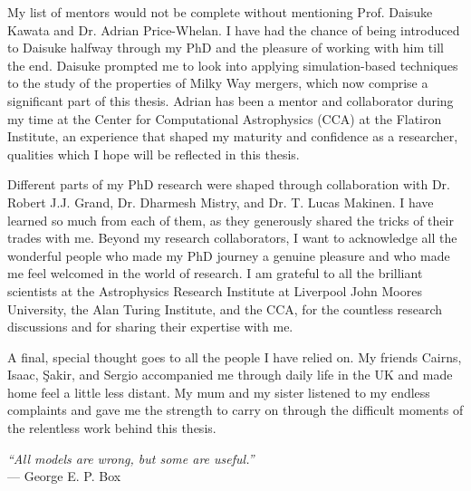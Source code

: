 \documentclass[a4paper,12pt,oneside]{report}
\begin{document}
\medskip

My list of mentors would not be complete without mentioning Prof. Daisuke Kawata and Dr. Adrian Price-Whelan. I have had the chance of being introduced to Daisuke halfway through my PhD and the pleasure of working with him till the end. Daisuke prompted me to look into applying simulation-based techniques to the study of the properties of Milky Way mergers, which now comprise a significant part of this thesis. Adrian has been a mentor and collaborator during my time at the Center for Computational Astrophysics (CCA) at the Flatiron Institute, an experience that shaped my maturity and confidence as a researcher, qualities which I hope will be reflected in this thesis.

\medskip

Different parts of my PhD research were shaped through collaboration with Dr. Robert J.J. Grand, Dr. Dharmesh Mistry, and Dr. T. Lucas Makinen. I have learned so much from each of them, as they generously shared the tricks of their trades with me. Beyond my research collaborators, I want to acknowledge all the wonderful people who made my PhD journey a genuine pleasure and who made me feel welcomed in the world of research. I am grateful to all the brilliant scientists at the Astrophysics Research Institute at Liverpool John Moores University, the Alan Turing Institute, and the CCA, for the countless research discussions and for sharing their expertise with me.

\medskip

A final, special thought goes to all the people I have relied on. My friends Cairns, Isaac, Şakir, and Sergio accompanied me through daily life in the UK and made home feel a little less distant. My mum and my sister listened to my endless complaints and gave me the strength to carry on through the difficult moments of the relentless work behind this thesis.

\clearpage

\thispagestyle{empty}
\vspace*{2cm}
\hfill\begin{minipage}{0.6\textwidth}
\raggedleft
\textit{``All models are wrong, but some are useful.''}\\[0.5cm]
--- George E. P. Box
\end{minipage}
\vfill
\clearpage

\tableofcontents
\listoffigures
\listoftables
\end{document}
